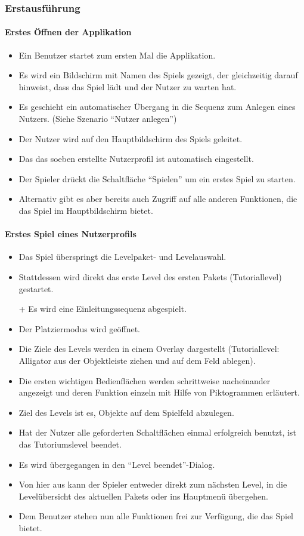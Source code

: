 \subsubsection{Erstausführung}
\paragraph{Erstes Öffnen der Applikation}
\begin{itemize}
\item Ein Benutzer startet zum ersten Mal die Applikation. 
\item Es wird ein Bildschirm mit Namen des Spiels gezeigt, der gleichzeitig darauf
hinweist, dass das Spiel lädt und der Nutzer zu warten hat.
\item Es geschieht ein automatischer Übergang in die Sequenz zum
Anlegen eines Nutzers. \newline (Siehe Szenario "`Nutzer anlegen"')
\item Der Nutzer wird auf den Hauptbildschirm des Spiels geleitet. 
\item Das das soeben erstellte Nutzerprofil ist automatisch eingestellt.
\item Der Spieler drückt die Schaltfläche "`Spielen"' um ein erstes Spiel zu starten.
\item Alternativ gibt es aber bereits auch Zugriff auf alle anderen Funktionen,
die das Spiel im Hauptbildschirm bietet.
\end{itemize}

\paragraph{Erstes Spiel eines Nutzerprofils}
\begin{itemize}
\item Das Spiel überspringt die Levelpaket- und Levelauswahl.
\item Stattdessen wird direkt das erste Level des ersten Pakets (Tutoriallevel) gestartet.
\item[+] Es wird eine Einleitungssequenz abgespielt.
\item Der Platziermodus wird geöffnet.
\item Die Ziele des Levels werden in einem Overlay dargestellt (Tutoriallevel: Alligator aus der Objektleiste ziehen und auf dem Feld ablegen).
\item Die ersten wichtigen Bedienflächen werden schrittweise nacheinander angezeigt und deren Funktion
einzeln mit Hilfe von Piktogrammen erläutert.
\item Ziel des Levels ist es, Objekte auf dem Spielfeld abzulegen.
\item Hat der Nutzer alle geforderten Schaltflächen einmal erfolgreich benutzt, ist das Tutoriumslevel beendet.
\item Es wird übergegangen in den "`Level beendet"'-Dialog. 
\item Von hier aus kann der Spieler entweder direkt zum nächsten Level, in die Levelübersicht des aktuellen Pakets oder
ins Hauptmenü übergehen.
\item Dem Benutzer stehen nun alle Funktionen frei zur Verfügung, die das Spiel 
bietet.
\end{itemize}
